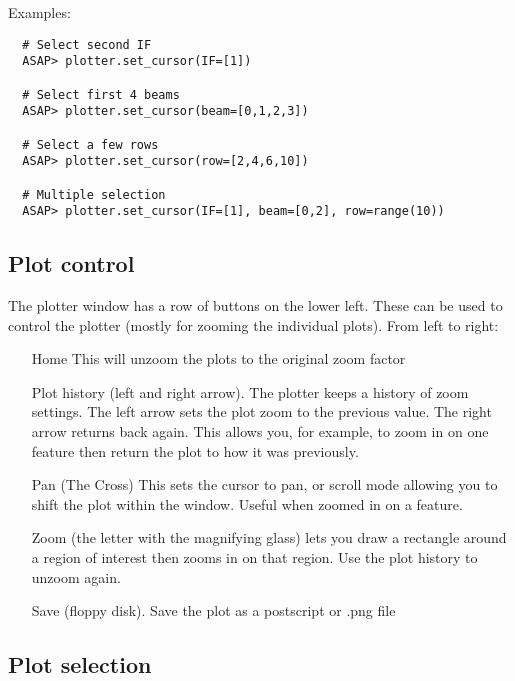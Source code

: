 \documentclass[11pt]{article}
\begin{document}
Examples:

\begin{verbatim}
  # Select second IF
  ASAP> plotter.set_cursor(IF=[1])

  # Select first 4 beams
  ASAP> plotter.set_cursor(beam=[0,1,2,3])

  # Select a few rows
  ASAP> plotter.set_cursor(row=[2,4,6,10])

  # Multiple selection
  ASAP> plotter.set_cursor(IF=[1], beam=[0,2], row=range(10))
\end{verbatim}

\subsection{Plot control}

The plotter window has a row of buttons on the lower left. These can
be used to control the plotter (mostly for zooming the individual
plots). From left to right:

\begin{itemize}

\item[Home] This will unzoom the plots to the original zoom factor

\item[Plot history] (left and right arrow). The plotter keeps a
history of zoom settings. The left arrow sets the plot zoom to the
previous value. The right arrow returns back again. This allows you,
for example, to zoom in on one feature then return the plot to how it
was previously.

\item[Pan] (The Cross) This sets the cursor to pan, or scroll mode
       allowing you to shift the plot within the window. Useful when
       zoomed in on a feature.

\item[Zoom] (the letter with the magnifying glass) lets you draw a
       rectangle around a region of interest then zooms in on that
       region. Use the plot history to unzoom again.  

\item[Save] (floppy disk). Save the plot as a postscript or .png file

\end{itemize}

\subsection{Plot selection}
\end{document}
